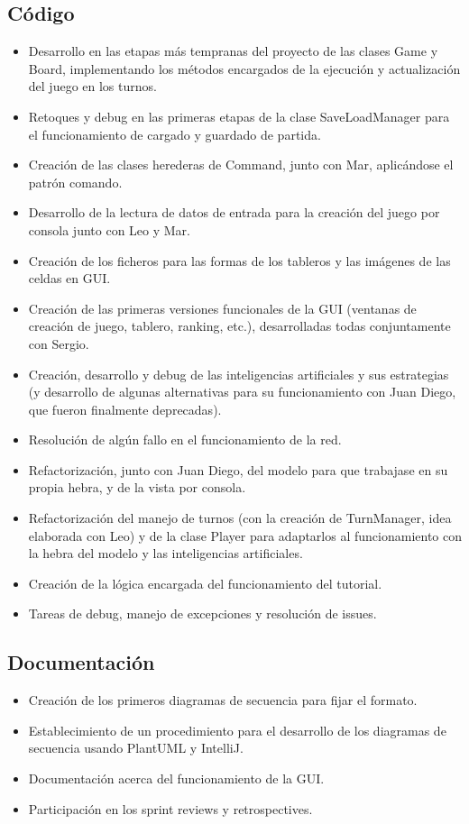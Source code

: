 \documentclass{article}
\begin{document}
\subsection*{Código}
\begin{itemize}
\item Desarrollo en las etapas más tempranas del proyecto de las clases Game y Board, implementando los métodos encargados de la ejecución y actualización del juego en los turnos.
\item Retoques y debug en las primeras etapas de la clase SaveLoadManager para el funcionamiento de cargado y guardado de partida.
\item Creación de las clases herederas de Command, junto con Mar, aplicándose el patrón comando.
\item Desarrollo de la lectura de datos de entrada para la creación del juego por consola junto con Leo y Mar.
\item Creación de los ficheros para las formas de los tableros y las imágenes de las celdas en GUI.
\item Creación de las primeras versiones funcionales de la GUI  (ventanas de creación de juego, tablero, ranking, etc.), desarrolladas todas conjuntamente con Sergio.
\item Creación, desarrollo y debug de las inteligencias artificiales y sus estrategias (y desarrollo de algunas alternativas para su funcionamiento con Juan Diego, que fueron finalmente deprecadas).
\item Resolución de algún fallo en el funcionamiento de la red.
\item Refactorización, junto con Juan Diego, del modelo para que trabajase en su propia hebra, y de la vista por consola.
\item Refactorización del manejo de turnos (con la creación de TurnManager, idea elaborada con Leo) y de la clase Player para adaptarlos al funcionamiento con la hebra del modelo y las inteligencias artificiales.
\item Creación de la lógica encargada del funcionamiento del tutorial.
\item Tareas de debug, manejo de excepciones y resolución de issues.
\end{itemize}

\subsection*{Documentación}
\begin{itemize}
\item Creación de los primeros diagramas de secuencia para fijar el formato.
\item Establecimiento de un procedimiento para el desarrollo de los diagramas de secuencia usando PlantUML y IntelliJ.
\item Documentación acerca del funcionamiento de la GUI.
\item Participación en los sprint reviews y retrospectives.

\end{itemize}
\end{document}
